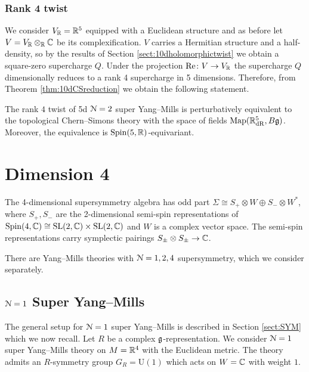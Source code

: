 \documentclass[10pt, oneside]{article}
\renewcommand{\Re}{\mathrm{Re}}
\renewcommand{\U}{\mathrm{U}}
\begin{document}
\subsubsection{Rank 4 twist}
\label{sect:5drank4twist}

We consider $V_\mathbb R=\mathbb R^5$ equipped with a Euclidean structure and as before let $V=V_\mathbb R\otimes_\mathbb R\mathbb C$ be its complexification. $V$ carries a Hermitian structure and a half-density, so by the results of Section \ref{sect:10dholomorphictwist} we obtain a square-zero supercharge $Q$. Under the projection $\Re\colon V\rightarrow V_\RR$ the supercharge $Q$ dimensionally reduces to a rank 4 supercharge in 5 dimensions. Therefore, from Theorem \ref{thm:10dCSreduction} we obtain the following statement.

\begin{theorem}
The rank $4$ twist of 5d $\mathcal N=2$ super Yang--Mills is perturbatively equivalent to the topological Chern--Simons theory with the space of fields $\operatorname{Map}(\mathbb R^5_{\mathrm{dR}}, B\mathfrak g)$. Moreover, the equivalence is $\mathrm{Spin}(5, \mathbb R)$-equivariant.
\end{theorem}
 
\section{Dimension 4}

The 4-dimensional supersymmetry algebra has odd part $\Sigma\cong S_+\otimes W\oplus S_-\otimes W^*$, where $S_+, S_-$ are the 2-dimensional semi-spin representations of $\mathrm{Spin}(4, \mathbb C)\cong \mathrm{SL}(2, \mathbb C) \times \mathrm{SL}(2, \mathbb C)$ and $W$ is a complex vector space. The semi-spin representations carry symplectic pairings $S_\pm\otimes S_\pm\rightarrow \mathbb C$.

There are Yang--Mills theories with $\mathcal N=1,2,4$ supersymmetry, which we consider separately.

\subsection{\texorpdfstring{$\mathcal N=1$}{N=1} Super Yang--Mills} \label{sect:4d_1_section}
The general setup for $\mathcal N=1$ super Yang--Mills is described in Section \ref{sect:SYM} which we now recall.  Let $R$ be a complex $\mathfrak g$-representation. We consider $\mathcal N=1$ super Yang--Mills theory on $M=\mathbb R^4$ with the Euclidean metric. The theory admits an $R$-symmetry group $G_R=\U(1)$ which acts on $W=\mathbb C$ with weight $1$.

\vspace{-10pt}
\end{document}
